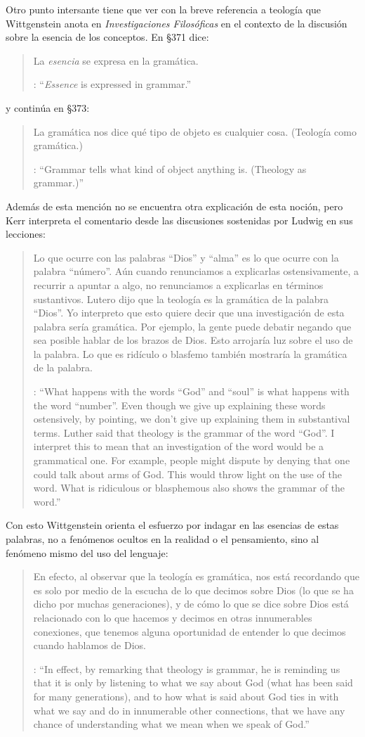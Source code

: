 Otro punto intersante tiene que ver con la breve referencia a teología que Wittgenstein anota en \emph{Investigaciones Filosóficas} en el contexto de la discusión sobre la esencia de los conceptos. En \S371 dice: \blockquote[{\cite[\S371]{wittgenstein1953phiinv}}: \enquote{\emph{Essence} is expressed in grammar.}]{La \emph{esencia} se expresa en la gramática.} y continúa en \S373: \blockquote[{\cite[\S371]{wittgenstein1953phiinv}}: \enquote{Grammar tells what kind of object anything is. (Theology as grammar.)}]{La gramática nos dice qué tipo de objeto es cualquier cosa. (Teología como gramática.)} Además de esta mención no se encuentra otra explicación de esta noción, pero Kerr interpreta el comentario desde las discusiones sostenidas por Ludwig en sus lecciones: \blockquote[{\cite[32]{ambrose2001lectures}}: \enquote{What happens with the words ``God'' and ``soul'' is what happens with the word ``number''. Even though we give up explaining these words ostensively, by pointing, we don't give up explaining them in substantival terms. \textelp{} Luther said that theology is the grammar of the word ``God''. I interpret this to mean that an investigation of the word would be a grammatical one. For example, people might dispute by denying that one could talk about arms of God. This would throw light on the use of the word. What is ridiculous or blasphemous also shows the grammar of the word.}]{Lo que ocurre con las palabras ``Dios'' y ``alma'' es lo que ocurre con la palabra ``número''. Aún cuando renunciamos a explicarlas ostensivamente, a recurrir a apuntar a algo, no renunciamos a explicarlas en términos sustantivos. \textelp{} Lutero dijo que la teología es la gramática de la palabra ``Dios''. Yo interpreto que esto quiere decir que una investigación de esta palabra sería gramática. Por ejemplo, la gente puede debatir negando que sea posible hablar de los brazos de Dios. Esto arrojaría luz sobre el uso de la palabra. Lo que es ridículo o blasfemo también mostraría la gramática de la palabra.} Con esto Wittgenstein orienta el esfuerzo por indagar en las esencias de estas palabras, no a fenómenos ocultos en la realidad o el pensamiento, sino al fenómeno mismo del uso del lenguaje: \blockquote[{\cite[148--149]{kerr1997theo}}: \enquote{In effect, by remarking that theology is grammar, he is reminding us that it is only by listening to what we say about God (what has been said for many generations), and to how what is said about God ties in with what we say and do in innumerable other connections, that we have any chance of understanding what we mean when we speak of God.}]{En efecto, al observar que la teología es gramática, nos está recordando que es solo por medio de la escucha de lo que decimos sobre Dios (lo que se ha dicho por muchas generaciones), y de cómo lo que se dice sobre Dios está relacionado con lo que hacemos y decimos en otras innumerables conexiones, que tenemos alguna oportunidad de entender lo que decimos cuando hablamos de Dios.}
